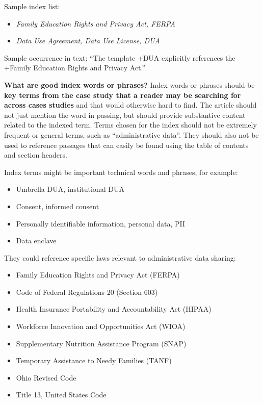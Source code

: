 \documentclass[
]{WileySix}
\providecommand{\tightlist}{%
  \setlength{\itemsep}{0pt}\setlength{\parskip}{0pt}}
\begin{document}
Sample index list:

\begin{itemize}
\tightlist
\item
  \emph{Family Education Rights and Privacy Act, FERPA}
\item
  \emph{Data Use Agreement, Data Use License, DUA}
\end{itemize}

Sample occurrence in text: ``The template +DUA\textbar{} explicitly references the +Family Education Rights and Privacy Act\textbar.''

\textbf{What are good index words or phrases?} Index words or phrases should be \textbf{key terms from the case study that a reader may be searching for across cases studies} and that would otherwise hard to find. The article should not just mention the word in passing, but should provide substantive content related to the indexed term. Terms chosen for the index should not be extremely frequent or general terms, such as ``administrative data''. They should also not be used to reference passages that can easily be found using the table of contents and section headers.

Index terms might be important technical words and phrases, for example:

\begin{itemize}
\tightlist
\item
  Umbrella DUA, institutional DUA
\item
  Consent, informed consent
\item
  Personally identifiable information, personal data, PII
\item
  Data enclave
\end{itemize}

They could reference specific laws relevant to administrative data sharing:

\begin{itemize}
\tightlist
\item
  Family Education Rights and Privacy Act (FERPA)
\item
  Code of Federal Regulations 20 (Section 603)
\item
  Health Insurance Portability and Accountability Act (HIPAA)
\item
  Workforce Innovation and Opportunities Act (WIOA)
\item
  Supplementary Nutrition Assistance Program (SNAP)
\item
  Temporary Assistance to Needy Families (TANF)
\item
  Ohio Revised Code
\item
  Title 13, United States Code
\end{itemize}
\end{document}
